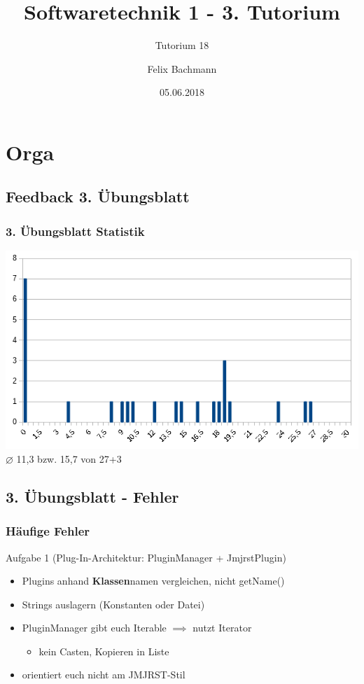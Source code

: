 \documentclass[18pt]{beamer}
\title[SWT1]{Softwaretechnik 1 - 3. Tutorium}
\subtitle{Tutorium 18}
\author{Felix Bachmann}
\date{05.06.2018}
\institute{KIT - Institut für Programmstrukturen und Datenorganisation (IPD)}
\begin{document}

\begin{frame}
\titlepage
\end{frame}

\section{Orga}
	\subsection{Feedback 3. Übungsblatt}
	\begin{frame}
		\frametitle{3. Übungsblatt Statistik}
		\includegraphics[scale=0.7]{./pics/tut3/statistics-ub3.png}
		\linebreak \centering $\diameter$ 11,3 bzw. 15,7 von 27+3
	\end{frame}
	
	\subsection{3. Übungsblatt - Fehler}
	\begin{frame}
		\frametitle{Häufige Fehler}
		\begin{block}{Aufgabe 1 (Plug-In-Architektur: PluginManager + JmjrstPlugin)}
			\begin{itemize}
				\pause
				\item Plugins anhand \textbf{Klassen}namen vergleichen, nicht getName() \pause
				\item Strings auslagern (Konstanten oder Datei) \pause
				\item PluginManager gibt euch Iterable $\implies$ nutzt Iterator
				\begin{itemize}
					\item kein Casten, Kopieren in Liste \pause
				\end{itemize}
 				\item orientiert euch nicht am JMJRST-Stil
			\end{itemize}
		\end{block}
	\end{frame}
\end{document}
